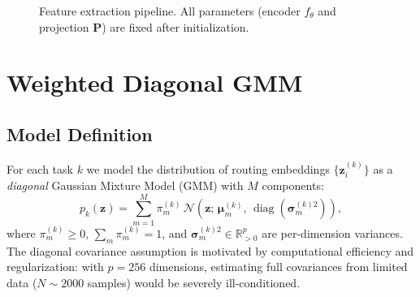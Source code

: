 \documentclass[12pt,a4paper]{article}
\begin{document}
\begin{figure}[t]
\centering
{}
\caption{Feature extraction pipeline. All parameters (encoder $f_\theta$ and projection $\mathbf{P}$) are fixed after initialization.}
\label{fig:pipeline}
\end{figure}

\section{Weighted Diagonal GMM}
\label{sec:gmm}

\subsection{Model Definition}

For each task $k$ we model the distribution of routing embeddings $\{\mathbf{z}_i^{(k)}\}$ as a \emph{diagonal} Gaussian Mixture Model (GMM) with $M$ components:
\begin{equation}
    p_k(\mathbf{z}) = \sum_{m=1}^{M} \pi_m^{(k)} \, \mathcal{N}\!\left(\mathbf{z};\, \bm{\mu}_m^{(k)},\, \operatorname{diag}\!\left(\bm{\sigma}_m^{(k)2}\right)\right),
    \label{eq:gmm}
\end{equation}
where $\pi_m^{(k)} \geq 0$, $\sum_m \pi_m^{(k)} = 1$, and $\bm{\sigma}_m^{(k)2} \in \mathbb{R}^p_{>0}$ are per-dimension variances.
The diagonal covariance assumption is motivated by computational efficiency and regularization: with $p=256$ dimensions, estimating full covariances from limited data ($N \sim 2000$ samples) would be severely ill-conditioned.
\end{document}
